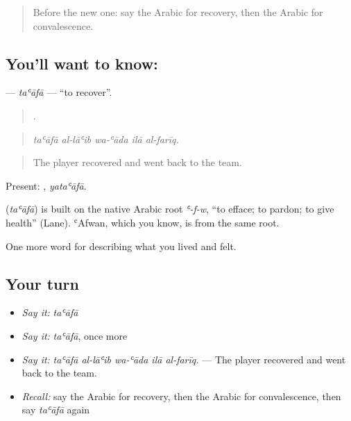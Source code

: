\label{lesson:AR-C512-taafa}



\begin{quote}
Before the new one: say the Arabic for recovery, then the Arabic for convalescence.
\end{quote}

\subsection*{You'll want to know: }
\textbf{} — \emph{taʿāfā} — \textquotedblleft{}to recover\textquotedblright{}.

\begin{quote}
    .
\end{quote}

\begin{quote}
\emph{taʿāfā al-lāʿib wa-ʿāda ilā al-farīq.}
\end{quote}

\begin{quote}
The player recovered and went back to the team.
\end{quote}

Present: , \emph{yataʿāfā}.

\begin{cousinweb}
\textbf{} (\emph{taʿāfā}) is built on the native Arabic root \emph{ʿ-f-w}, \textquotedblleft{}to efface; to pardon; to give health\textquotedblright{} (Lane). ʿAfwan, which you know, is from the same root.
\end{cousinweb}

\begin{grammarlens}[title={What you've built}]
One more word for describing what you lived and felt.
\end{grammarlens}

\subsection*{Your turn}
\begin{itemize}
\raggedright
  \item \emph{Say it:} \emph{taʿāfā}
  \item \emph{Say it:} \emph{taʿāfā}, once more
  \item \emph{Say it:} \emph{taʿāfā al-lāʿib wa-ʿāda ilā al-farīq.} — The player recovered and went back to the team.
  \item \emph{Recall:} say the Arabic for recovery, then the Arabic for convalescence, then say \emph{taʿāfā} again
\end{itemize}


